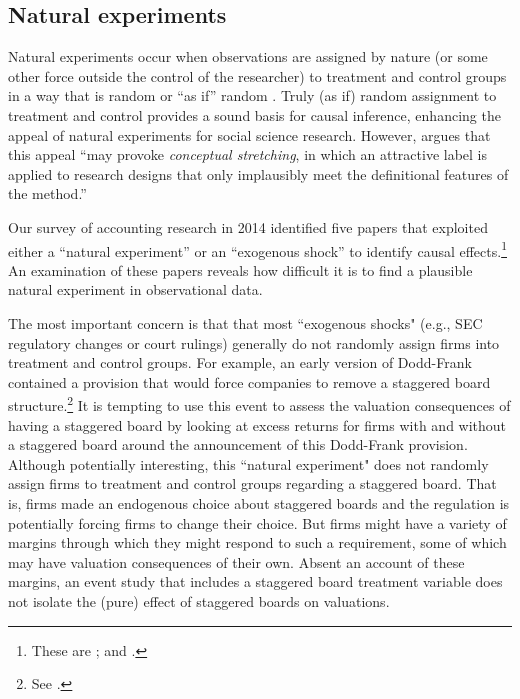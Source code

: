 \documentclass[12pt,reqno,titlepage]{amsart}
\begin{document}
\begin{doublespace}
\subsection{Natural experiments}
Natural experiments occur when observations are assigned by nature (or some other force outside the control of the researcher) to treatment and control groups in a way that is random or ``as if'' random \citep{Dunning:2012tt}. 
Truly (as if) random assignment to treatment and control provides a sound basis for causal inference, enhancing the appeal of natural experiments for social science research.
However, \citet[\,p.3, emphasis added]{Dunning:2012tt} argues that this appeal ``may provoke \emph{conceptual stretching}, in which an attractive label is applied to research designs that only implausibly meet the definitional features of the method.'' 

Our survey of accounting research in 2014 identified five papers that exploited either a ``natural experiment'' or an ``exogenous shock'' to identify causal effects.\footnote{These are \citet{Lo:2013jk,Aier:2014ii,Kirk:2014gx,Houston:2014hv}; and \citet{Hail:2014fq}.}
An examination of these papers reveals how difficult it is to find a plausible natural experiment in observational data.

The most important concern is that that most ``exogenous shocks" (e.g., SEC regulatory changes or court rulings) generally do not randomly assign firms into treatment and control groups.
For example, an early version of Dodd-Frank contained a provision that would force companies to remove a staggered board structure.\footnote{See \citet{Larcker:2011hs}.}
It is tempting to use this event to assess the valuation consequences of having a staggered board by looking at excess returns for firms with and without a staggered board around the announcement of this Dodd-Frank provision.
Although potentially interesting, this ``natural experiment" does not randomly assign firms to treatment and control groups regarding a staggered board.  That is, firms made an endogenous choice about staggered boards and the regulation is potentially forcing firms to change their choice. But firms might have a variety of margins through which they might respond to such a requirement, some of which may have valuation consequences of their own. Absent an account of these margins, an event study that includes a staggered board treatment variable does not isolate the (pure) effect of staggered boards on valuations. 


\end{doublespace}
\end{document}
